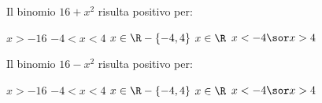 \begin{esercizio}
\label{ese:4.24}
Il binomio \(16+x^2\) risulta positivo per:

\; \(x>-16\)\quad {}\; \(-4<x<4\) \quad{}\; \(x\in 
\R-\{-4,4\}\) 
\quad{}\; \(x\in \R\) \quad{}\; \(x<-4 \sor x>4\)
\end{esercizio}

\begin{esercizio}
\label{ese:4.25}
Il binomio \(16-x^2\) risulta positivo per:

\; \(x>-16\)\quad {}\; \(-4<x<4\) \quad{}\; \(x\in 
\R-\{-4,4\}\) 
\quad{}\; \(x\in \R\) \quad{}\; \(x<-4 \sor x>4\)
\end{esercizio}


